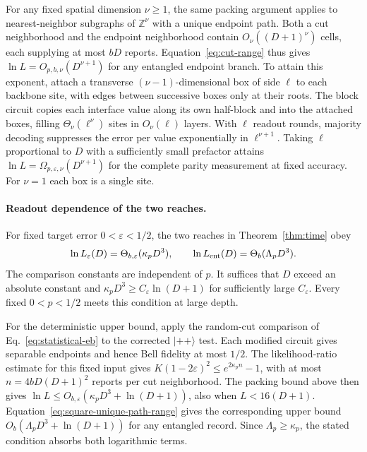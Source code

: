 \documentclass[aps,prl,twocolumn,superscriptaddress,longbibliography,reprint,floatfix]{revtex4-2}
\newcommand{\ket}[1]{\lvert #1\rangle}
\newcommand{\eps}{\varepsilon}
\begin{document}
For any fixed spatial dimension $\nu\ge1$, the same packing argument
applies to nearest-neighbor subgraphs of $\mathbb Z^\nu$ with a unique
endpoint path. Both a cut neighborhood and the endpoint neighborhood
contain $O_\nu((D+1)^\nu)$ cells, each supplying at most $bD$ reports.
Equation~\eqref{eq:cut-range} thus gives $\ln L=O_{p,b,\nu}(D^{\nu+1})$
for any entangled endpoint branch. To attain this exponent, attach a
transverse $(\nu-1)$-dimensional box of side $\ell$ to each backbone
site, with edges between successive boxes only at their roots. The block
circuit copies each interface value along its own half-block and into
the attached boxes, filling $\Theta_\nu(\ell^\nu)$ sites in $O_\nu(\ell)$
layers. With $\ell$ readout rounds, majority decoding suppresses the
error per value exponentially in $\ell^{\nu+1}$. Taking $\ell$ proportional
to $D$ with a sufficiently small prefactor attains
$\ln L=\Omega_{p,\eps,\nu}(D^{\nu+1})$ for the complete parity
measurement at fixed accuracy. For $\nu=1$ each box is a single site.

\paragraph*{Readout dependence of the two reaches.}
For fixed target error $0<\eps<1/2$, the two reaches in
Theorem~\ref{thm:time} obey
\begin{equation}
 \ln L_\eps(D)=\Theta_{b,\eps}(\kappa_pD^3),\qquad
 \ln L_{\rm ent}(D)=\Theta_b(\Lambda_pD^3).
 \label{eq:two-reach-costs}
\end{equation}
The comparison constants are independent of $p$. It suffices that $D$
exceed an absolute constant and $\kappa_pD^3\ge C_\eps\ln(D+1)$ for
sufficiently large $C_\eps$. Every fixed $0<p<1/2$ meets this condition
at large depth.

For the deterministic upper bound, apply the random-cut comparison
of Eq.~\eqref{eq:statistical-eb} to the corrected $\ket{++}$ test.
Each modified circuit gives separable endpoints and hence Bell fidelity
at most $1/2$. The likelihood-ratio estimate for this fixed input gives
$K(1-2\eps)^2\le e^{2\kappa_p n}-1$, with at most
$n=4bD(D+1)^2$ reports per cut neighborhood. The packing bound above
then gives $\ln L\le O_{b,\eps}(\kappa_pD^3+\ln(D+1))$, also when
$L<16(D+1)$. Equation~\eqref{eq:square-unique-path-range} gives the
corresponding upper bound $O_b(\Lambda_pD^3+\ln(D+1))$ for any
entangled record. Since $\Lambda_p\ge\kappa_p$, the stated condition
absorbs both logarithmic terms.
\end{document}

